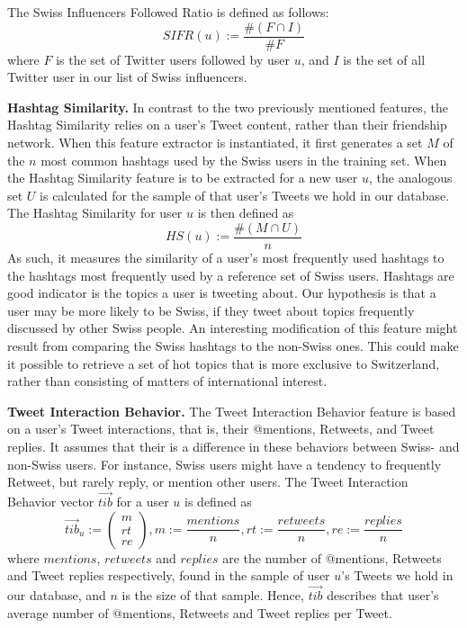 \documentclass[10pt,a4paper]{article}
\begin{document}
The Swiss Influencers Followed Ratio is defined as follows:
\begin{equation}
SIFR(u) := \frac{\#(F\cap I)}{\#F}
\end{equation}
where $F$ is the set of Twitter users followed by user $u$, and $I$ is the set of all Twitter user in our list of Swiss influencers.

\textbf{Hashtag Similarity.} In contrast to the two previously mentioned features, the Hashtag Similarity relies on a user's Tweet content, rather than their friendship network. When this feature extractor is instantiated, it first generates a set $M$ of the $n$ most common hashtags used by the Swiss users in the training set. When the Hashtag Similarity feature is to be extracted for a new user $u$, the analogous set $U$ is calculated for the sample of that user's Tweets we hold in our database. The Hashtag Similarity for user $u$ is then defined as
\begin{equation}
HS(u) := \frac{\#(M\cap U)}{n}
\end{equation}
As such, it measures the similarity of a user's most frequently used hashtags to the hashtags most frequently used by a reference set of Swiss users. Hashtags are good indicator is the topics a user is tweeting about. Our hypothesis is that a user may be more likely to be Swiss, if they tweet about topics frequently discussed by other Swiss people. An interesting modification of this feature might result from comparing the Swiss hashtags to the non-Swiss ones. This could make it possible to retrieve a set of hot topics that is more exclusive to Switzerland, rather than consisting of matters of international interest.

\textbf{Tweet Interaction Behavior.} The Tweet Interaction Behavior feature is based on a user's Tweet interactions, that is, their @mentions, Retweets, and Tweet replies. It assumes that their is a difference in these behaviors between Swiss- and non-Swiss users. For instance, Swiss users might have a tendency to frequently Retweet, but rarely reply, or mention other users. The Tweet Interaction Behavior vector $\overrightarrow{tib}$ for a user $u$ is defined as
\begin{equation}
\overrightarrow{tib}_u := 
\begin{pmatrix}
m \\ rt \\ re
\end{pmatrix}, m := \frac{mentions}{n}, rt := \frac{retweets}{n}, re := \frac{replies}{n}
\end{equation}
where $mentions$, $retweets$ and $replies$ are the number of @mentions, Retweets and Tweet replies respectively, found in the sample of user $u$'s Tweets we hold in our database, and $n$ is the size of that sample. Hence, $\overrightarrow{tib}$ describes that user's average number of @mentions, Retweets and Tweet replies per Tweet.
\end{document}
